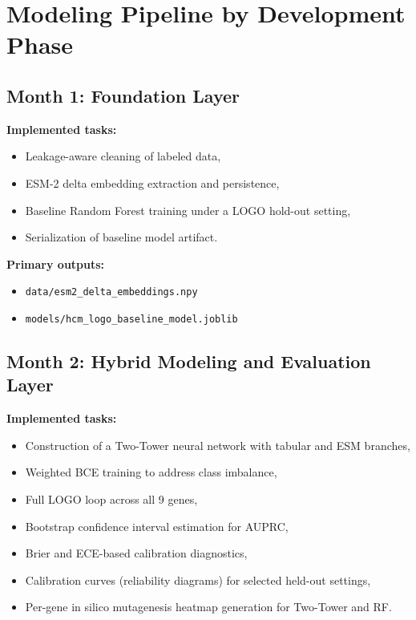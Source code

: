 \documentclass[11pt,a4paper]{article}
\begin{document}
\section{Modeling Pipeline by Development Phase}
\subsection{Month 1: Foundation Layer}
\textbf{Implemented tasks:}
\begin{itemize}[leftmargin=1.2cm]
    \item Leakage-aware cleaning of labeled data,
    \item ESM-2 delta embedding extraction and persistence,
    \item Baseline Random Forest training under a LOGO hold-out setting,
    \item Serialization of baseline model artifact.
\end{itemize}

\textbf{Primary outputs:}
\begin{itemize}[leftmargin=1.2cm]
    \item \texttt{data/esm2\_delta\_embeddings.npy}
    \item \texttt{models/hcm\_logo\_baseline\_model.joblib}
\end{itemize}

\subsection{Month 2: Hybrid Modeling and Evaluation Layer}
\textbf{Implemented tasks:}
\begin{itemize}[leftmargin=1.2cm]
    \item Construction of a Two-Tower neural network with tabular and ESM branches,
    \item Weighted BCE training to address class imbalance,
    \item Full LOGO loop across all 9 genes,
    \item Bootstrap confidence interval estimation for AUPRC,
    \item Brier and ECE-based calibration diagnostics,
    \item Calibration curves (reliability diagrams) for selected held-out settings,
    \item Per-gene in silico mutagenesis heatmap generation for Two-Tower and RF.
\end{itemize}
\end{document}
